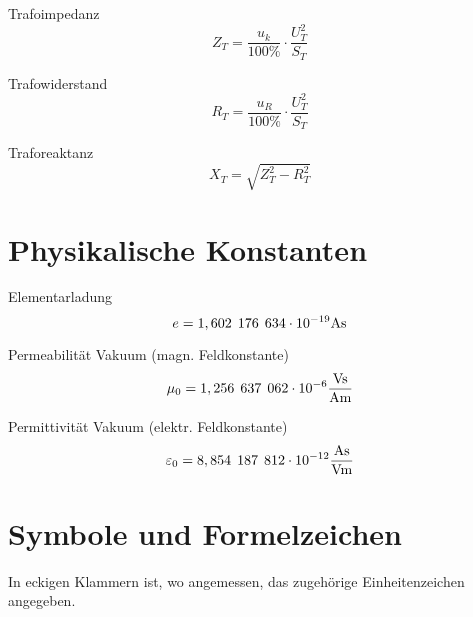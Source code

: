\documentclass[11pt, a4paper, draft, fleqn, twocolumn]{article}
\numberwithin{equation}{subsection}
\begin{document}
\noindent Trafoimpedanz
\begin{equation}
    Z_T = \frac{u_{k}}{100\%} \cdot \frac{U_{T}^2}{S_{T}}
\end{equation}

\noindent Trafowiderstand
\begin{equation}
    R_T = \frac{u_{R}}{100\%} \cdot \frac{U_{T}^2}{S_{T}}
\end{equation}

\noindent Traforeaktanz
\begin{equation}
    X_T = \sqrt{Z_T^2 - R_T^2}
\end{equation}



\section{Physikalische Konstanten}

Elementarladung\footnotemark[1]
\begin{equation}
    e = 1,602 \hspace{1ex} 176 \hspace{1ex} 634 \cdot 10^{-19} \text{As}
\end{equation}

\noindent Permeabilität Vakuum (magn. Feldkonstante)\footnotemark[1]
\begin{equation}
    \mu_0 = 1,256 \hspace{1ex} 637 \hspace{1ex} 062 \cdot 10^{-6} \frac{\text{Vs}}{\text{Am}}
\end{equation}

\noindent Permittivität Vakuum (elektr. Feldkonstante)\footnotemark[1]
\begin{equation}
    \varepsilon_0 = 8,854 \hspace{1ex} 187 \hspace{1ex} 812 \cdot 10^{-12} \frac{\text{As}}{\text{Vm}}
\end{equation}




\section{Symbole und Formelzeichen}
\noindent In eckigen Klammern ist, wo angemessen, das zugehörige Einheitenzeichen angegeben. \\
\end{document}
